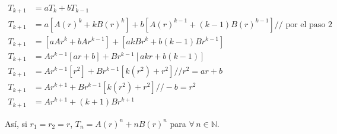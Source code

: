 \begin{align*}
T_{k+1}
&= aT_{k}+bT_{k-1}\\
T_{k+1}
&= a[A(r)^k+kB(r)^k]+b[A(r)^{k-1}+(k-1)B(r)^{k-1}] // \text{ por el paso 2}\\
T_{k+1}
&=[aAr^k+bAr^{k-1}]+[akBr^k+b(k-1)Br^{k-1}]\\
T_{k+1}
&=Ar^{k-1}[ar+b]+Br^{k-1}[akr + b(k-1)]\\
T_{k+1}
&=Ar^{k-1}[r^2]+Br^{k-1}[k(r^2) +r^2]//r^2 = ar + b\\
T_{k+1}
&=Ar^{k+1}+Br^{k-1}[k(r^2) + r^2]//-b = r^2\\
T_{k+1}
&=Ar^{k+1}+(k+1)Br^{k+1}
\end{align*}

Así, si $r_1=r_2=r$, $T_n=A(r)^n+nB(r)^n$ para $\forall\, n\in\mathds{N}$.